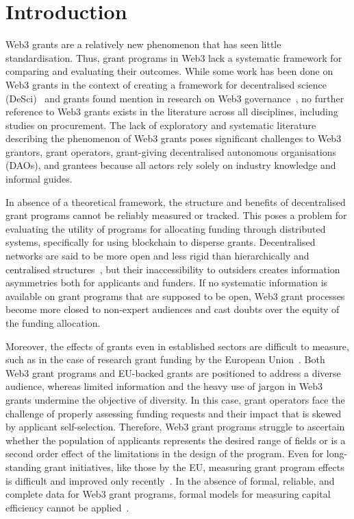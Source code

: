 \documentclass[conference]{IEEEtran}
\begin{document}
\section{Introduction}\label{sec_1}
Web3 grants are a relatively new phenomenon that has seen little standardisation. Thus, grant programs in Web3 lack a systematic framework for comparing and evaluating their outcomes. While some work has been done on Web3 grants in the context of creating a framework for decentralised science (DeSci)~\cite{ding_desci_2022} and grants found mention in research on Web3 governance~\cite{allen_exchange_2022}, no further reference to Web3 grants exists in the literature across all disciplines, including studies on procurement. The lack of exploratory and systematic literature describing the phenomenon of Web3 grants poses significant challenges to Web3 grantors, grant operators, grant-giving decentralised autonomous organisations (DAOs), and grantees because all actors rely solely on industry knowledge and informal guides.

In absence of a theoretical framework, the structure and benefits of decentralised grant programs cannot be reliably measured or tracked. This poses a problem for evaluating the utility of programs for allocating funding through distributed systems, specifically for using blockchain to disperse grants. Decentralised networks are said to be more open and less rigid than hierarchically and centralised structures~\cite{ding_desci_2022}, but their inaccessibility to outsiders creates information asymmetries both for applicants and funders. If no systematic information is available on grant programs that are supposed to be open, Web3 grant processes become more closed to non-expert audiences and cast doubts over the equity of the funding allocation.

Moreover, the effects of grants even in established sectors are difficult to measure, such as in the case of research grant funding by the European Union~\cite{selebaj_effects_2021}. Both Web3 grant programs and EU-backed grants are positioned to address a diverse audience, whereas limited information and the heavy use of jargon in Web3 grants undermine the objective of diversity. In this case, grant operators face the challenge of properly assessing funding requests and their impact that is skewed by applicant self-selection. Therefore, Web3 grant programs struggle to ascertain whether the population of applicants represents the desired range of fields or is a second order effect of the limitations in the design of the program. Even for long-standing grant initiatives, like those by the EU, measuring grant program effects is difficult and improved only recently~\cite{selebaj_effects_2021}. In the absence of formal, reliable, and complete data for Web3 grant programs, formal models for measuring capital efficiency cannot be applied~\cite{ odewole_capital_2020}.
\end{document}

